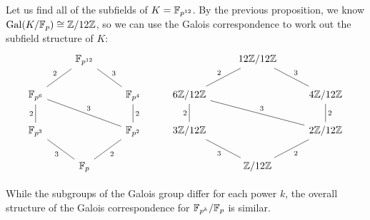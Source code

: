 \begin{example}
    Let us find all of the subfields of $K = \mathbb{{F}}_{p^{12}}$. By the previous proposition, we know $\operatorname{Gal}(K/\mathbb{{F}}_p) \cong \mathbb{{Z}}/{{12}}\mathbb{{Z}}$, so we can use the Galois correspondence to work out the subfield structure of $K$:
    \[
        \begin{tikzcd}
        	& {\mathbb{F}_{p^{12}}} &&& {12\mathbb{Z}/12\mathbb{Z}} \\
        	{\mathbb{F}_{p^6}} && {\mathbb{F}_{p^4}} & {6\mathbb{Z}/12\mathbb{Z}} && {4\mathbb{Z}/12\mathbb{Z}} \\
        	{\mathbb{F}_{p^3}} && {\mathbb{F}_{p^2}} & {3\mathbb{Z}/12\mathbb{Z}} && {2\mathbb{Z}/12\mathbb{Z}} \\
        	& {\mathbb{F}_p} &&& {\mathbb{Z}/12\mathbb{Z}}
        	\arrow["3", no head, from=4-2, to=3-1]
        	\arrow["2"', no head, from=4-2, to=3-3]
        	\arrow["2"', no head, from=3-3, to=2-3]
        	\arrow["2", no head, from=3-1, to=2-1]
        	\arrow["2", no head, from=2-1, to=1-2]
        	\arrow["3"', no head, from=2-3, to=1-2]
        	\arrow["3"', no head, from=3-3, to=2-1]
        	\arrow["2"', no head, from=4-5, to=3-6]
        	\arrow["2"', no head, from=3-6, to=2-6]
        	\arrow["3"', no head, from=2-6, to=1-5]
        	\arrow["2", no head, from=2-4, to=1-5]
        	\arrow["2", no head, from=3-4, to=2-4]
        	\arrow["3", no head, from=4-5, to=3-4]
        	\arrow["3"', no head, from=3-6, to=2-4]
        \end{tikzcd}
    \]
\end{example}

\begin{remark}
    While the subgroups of the Galois group differ for each power $k$, the overall structure of the Galois correspondence for $\mathbb{{F}}_{p^k}/\mathbb{{F}}_p$ is similar.
\end{remark}


